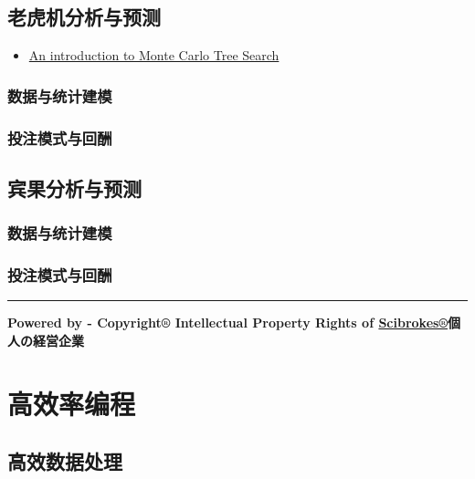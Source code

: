 \documentclass[]{book}
\providecommand{\tightlist}{%
  \setlength{\itemsep}{0pt}\setlength{\parskip}{0pt}}
\begin{document}
\section{老虎机分析与预测}

\begin{itemize}
\tightlist
\item
  \href{https://appsilon.com/an-introduction-to-monte-carlo-tree-search/}{An
  introduction to Monte Carlo Tree Search}
\end{itemize}

\subsection{数据与统计建模}\label{-2}

\subsection{投注模式与回酬}\label{-2}

\section{宾果分析与预测}

\subsection{数据与统计建模}\label{-3}

\subsection{投注模式与回酬}\label{-3}

\begin{center}\rule{0.5\linewidth}{\linethickness}\end{center}

\textbf{Powered by - Copyright® Intellectual Property Rights of
\href{http://www.scibrokes.com}{Scibrokes®}個人の経営企業}

\chapter{高效率编程}\label{hft}

\section{高效数据处理}
\end{document}
